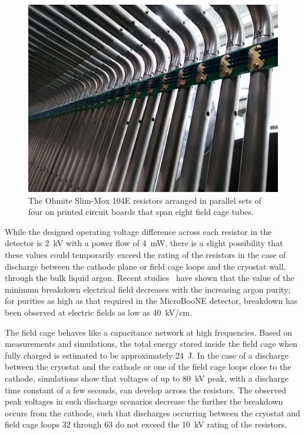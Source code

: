 \begin{figure}[htb]
\centering	
\includegraphics[width=0.8\linewidth]{figures/tpc-voltage-divider-slimmox.jpg}
\caption{The Ohmite Slim-Mox 104E resistors arranged in parallel sets of four on printed circuit boards that span eight field cage tubes.}
\label{fig:tpc-voltage-divider-slimmox}
\end{figure}

While the designed operating voltage difference across each resistor in the detector is 2~kV with a power flow of 4~mW, there is a slight possibility that these values could temporarily exceed the rating of the resistors in the case of discharge between the cathode plane or field cage loops and the cryostat wall, through the bulk liquid argon. Recent studies~\cite{Acciarri:2014ica} have shown that the value of the minimum breakdown electrical field decreases with the increasing argon purity; for purities as high as that required in the MicroBooNE detector, breakdown has been observed at electric fields as low as 40~kV/cm.

The field cage behaves like a capacitance network at high frequencies. Based on measurements and simulations, the total energy stored inside the field cage when fully charged is estimated to be approximately 24~J. In the case of a discharge between the cryostat and the cathode or one of the field cage loops close to the cathode, simulations show that voltages of up to 80~kV peak, with a discharge time constant of a few seconds, can develop across the resistors. The observed peak voltages in such discharge scenarios decrease the further the breakdown occurs from the cathode, such that discharges occurring between the cryostat and field cage loops 32 through 63 do not exceed the 10~kV rating of the resistors.

